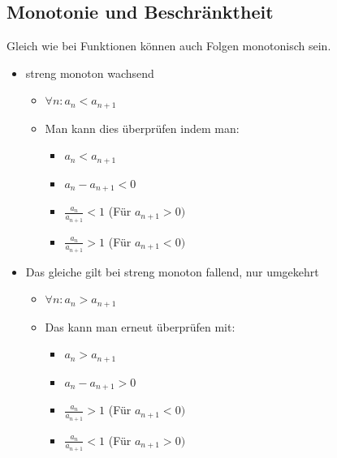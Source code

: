 \documentclass{article}
\begin{document}
	\subsection{Monotonie und Beschränktheit}
	Gleich wie bei Funktionen können auch Folgen monotonisch sein.
	\begin{itemize}
		\item{streng monoton wachsend}
		\begin{itemize}
			\item{$\forall n:a_n<a_{n+1}$}
			\item{Man kann dies überprüfen indem man:}
			\begin{itemize}
				\item{$a_n < a_{n+1}$}
				\item{$a_n-a_{n+1}<0$}
				\item{$\frac{a_n}{a_{n+1}}<1$ (Für $a_{n+1}>0)$}
				\item{$\frac{a_n}{a_{n+1}}>1$ (Für $a_{n+1}<0)$}
			\end{itemize}
		\end{itemize}
		\item{Das gleiche gilt bei streng monoton fallend, nur umgekehrt}
		\begin{itemize}
			\item{$\forall n:a_n>a_{n+1}$}
			\item{Das kann man erneut überprüfen mit:}
			\begin{itemize}
				\item{$a_n > a_{n+1}$}
				\item{$a_n-a_{n+1}>0$}
				\item{$\frac{a_n}{a_{n+1}}>1$ (Für $a_{n+1}<0)$}
				\item{$\frac{a_n}{a_{n+1}}<1$ (Für $a_{n+1}>0)$}
			\end{itemize}
		\end{itemize}
	\end{itemize}
\end{document}
